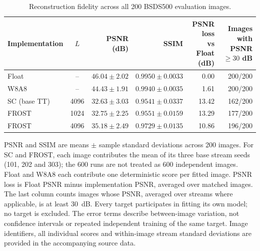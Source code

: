 \documentclass[pdflatex,sn-mathphys-num]{sn-jnl}
\theoremstyle{thmstyleone}
\theoremstyle{thmstyletwo}
\theoremstyle{thmstylethree}
\begin{document}
\begin{table}[!htbp]
\caption{Reconstruction fidelity across all 200 BSDS500 evaluation images.}
\label{tab:frost_coordinate_reconstruction}
\label{tab:frost_bsds500_reconstruction}
\centering
\fontsize{8}{9.5}\selectfont
\setlength{\tabcolsep}{3pt}
\renewcommand{\arraystretch}{1.1}
\begin{tabular*}{\linewidth}{@{\extracolsep{\fill}}lcrrrr@{}}
\toprule
Implementation & $L$ & PSNR (dB) & SSIM
& \shortstack{PSNR loss\\vs Float (dB)}
& \shortstack{Images with\\PSNR $\geq30$ dB} \\
\midrule
Float
& --
& $46.04\pm2.02$
& $0.9950\pm0.0033$
& 0.00 & 200/200 \\
W8A8
& --
& $44.43\pm1.91$
& $0.9940\pm0.0035$
& 1.61 & 200/200 \\
SC (base TT)
& 4096
& $32.63\pm3.03$
& $0.9541\pm0.0337$
& 13.42 & 162/200 \\
FROST
& 1024
& $32.75\pm2.25$
& $0.9551\pm0.0159$
& 13.29 & 177/200 \\
FROST
& 4096
& $35.18\pm2.49$
& $0.9729\pm0.0135$
& 10.86 & 196/200 \\
\bottomrule
\end{tabular*}
\par\vspace{3pt}
\begin{minipage}{\linewidth}
\fontsize{8}{9.5}\selectfont
PSNR and SSIM are means $\pm$ sample standard deviations across 200
images. For SC and FROST, each image contributes the mean of its three
base stream seeds (101, 202 and 303); the 600 runs are not treated as
600 independent images. Float and W8A8 each contribute one deterministic
score per fitted image. PSNR loss is Float PSNR minus implementation
PSNR, averaged over matched images. The last column counts images whose
PSNR, averaged over streams where applicable, is at least 30~dB.
Every target participates in fitting its own model; no target is excluded.
The error terms describe between-image variation, not confidence intervals
or repeated independent training of the same target. Image identifiers,
all individual scores and within-image stream standard deviations are
provided in the accompanying source data.
\end{minipage}
\end{table}
\end{document}
